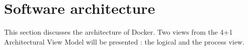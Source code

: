 
\clearpage
\chapter{Software architecture}
\label{ch:softwarearch}
This section discusses the architecture of Docker.  Two views from the 4+1
Architectural View Model\cite{fourplusone} will be presented : the logical and the process view.



% 



